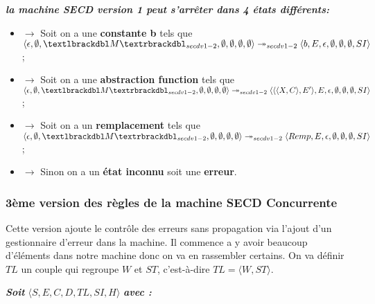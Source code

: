 \documentclass[10pt,a4paper]{report}
\begin{document}
	
	\textbf{\textit{la machine SECD version 1 peut s'arrêter dans 4 états différents:}}
	\smallbreak
	\begin{itemize}
		\item[]$\longrightarrow$ Soit on a une \textbf{constante b} tels que $\langle \epsilon,\emptyset,\textlbrackdbl M\textrbrackdbl_{secdv1-2},\emptyset,\emptyset,\emptyset,\emptyset\rangle \twoheadrightarrow_{secdv1-2} \langle b,E,\epsilon,\emptyset,\emptyset,\emptyset,SI\rangle$;
		\item[]$\longrightarrow$ Soit on a une \textbf{abstraction function} tels que $\langle \epsilon,\emptyset,\textlbrackdbl M\textrbrackdbl_{secdv1-2},\emptyset,\emptyset,\emptyset,\emptyset\rangle \twoheadrightarrow_{secdv1-2} \langle\langle\langle X,C\rangle,E'\rangle,E,\epsilon,\emptyset,\emptyset,\emptyset,SI\rangle$;
		\item[]$\longrightarrow$ Soit on a un \textbf{remplacement} tels que $\langle \epsilon,\emptyset,\textlbrackdbl M\textrbrackdbl_{secdv1-2},\emptyset,\emptyset,\emptyset,\emptyset\rangle \twoheadrightarrow_{secdv1-2} \langle Remp,E,\epsilon,\emptyset,\emptyset,\emptyset,SI\rangle$;
		\item[]$\longrightarrow$ Sinon on a un \textbf{état inconnu} soit une \textbf{erreur}.
	\end{itemize}
	\newpage
	
	
	\subsubsection{3ème version des règles de la machine SECD Concurrente}\label{SECDConc3}
	\smallbreak
	Cette version ajoute le contrôle des erreurs sans propagation via l'ajout d'un gestionnaire d'erreur dans la machine. Il commence a y avoir beaucoup d'éléments dans notre machine donc on va en rassembler certains. On va définir $TL$ un couple qui regroupe $W$ et $ST$, c'est-à-dire $TL = \langle W,ST\rangle$.
	\bigbreak
	
	\textbf{\textit{Soit}} $\langle S,E,C,D,TL,SI,H\rangle$ \textbf{\textit{avec :}}
	
\end{document}
